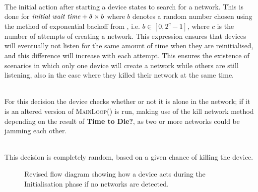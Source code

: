 \begin{description}[labelindent=\parindent]
    \item[Search for network]\hfill\\
    The initial action after starting a device states to search for a network.
    This is done for $\text{\textit{initial wait time}} + \delta \times b$ where $b$ denotes a random number chosen using the method of exponential backoff from , i.e. $b \in [0, 2^c-1]$, where $c$ is the number of attempts of creating a network.
    This expression ensures that devices will eventually not listen for the same amount of time when they are reinitialised, and this difference will increase with each attempt. This ensures the existence of scenarios in which only one device will create a network while others are still listening, also in the case where they killed their network at the same time.
    \item[Alone in network?]\hfill\\
    For this decision the device checks whether or not it is alone in the network; if it is an altered version of \textsc{MainLoop()} is run, making use of the kill network method depending on the result of \textbf{Time to Die?}, as two or more networks could be jamming each other.
    \item[Time to Die?]\hfill\\
    This decision is completely random, based on a given chance of killing the device.
\end{description}

\begin{figure}[p]
\centering
\footnotesize

\vspace{-15pt}
\caption{Revised flow diagram showing how a device acts during the Initialisation phase if no networks are detected.}
\label{fig:pseudo_flowMultiStart}
\vspace{-10pt}    
\end{figure}


